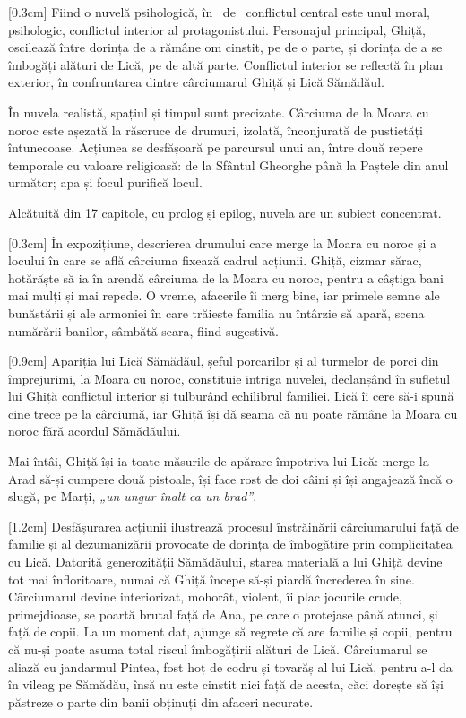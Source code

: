 [0.3cm]
Fiind o nuvelă psihologică, în \operatitle\ de \operaauthor\ conflictul central este unul moral, psihologic, conflictul interior al protagonistului. Personajul principal, Ghiță, oscilează între dorința de a rămâne om cinstit, pe de o parte, și dorința de a se îmbogăți alături de Lică, pe de altă parte. Conflictul interior se reflectă în plan exterior, în confruntarea dintre cârciumarul Ghiță și Lică Sămădăul.

În nuvela realistă, spațiul și timpul sunt precizate. Cârciuma de la Moara cu noroc este așezată la răscruce de drumuri, izolată, înconjurată de pustietăți întunecoase. Acțiunea se desfășoară pe parcursul unui an, între două repere temporale cu valoare religioasă: de la Sfântul Gheorghe până la Paștele din anul următor; apa și focul purifică locul.

Alcătuită din 17 capitole, cu prolog și epilog, nuvela are un subiect concentrat.

[0.3cm]
În expozițiune, descrierea drumului care merge la Moara cu noroc și a locului în care se află cârciuma fixează cadrul acțiunii. Ghiță, cizmar sărac, hotărăște să ia în arendă cârciuma de la Moara cu noroc, pentru a câștiga bani mai mulți și mai repede. O vreme, afacerile îi merg bine, iar primele semne ale bunăstării și ale armoniei în care trăiește familia nu întârzie să apară, scena numărării banilor, sâmbătă seara, fiind sugestivă.

[0.9cm]
Apariția lui Lică Sămădăul, șeful porcarilor și al turmelor de porci din împrejurimi, la Moara cu noroc, constituie intriga nuvelei, declanșând în sufletul lui Ghiță conflictul interior și tulburând echilibrul familiei. Lică îi cere să-i spună cine trece pe la cârciumă, iar Ghiță își dă seama că nu poate rămâne la Moara cu noroc fără acordul Sămădăului.

Mai întâi, Ghiță își ia toate măsurile de apărare împotriva lui Lică: merge la Arad să-și cumpere două pistoale, își face rost de doi câini și își angajează încă o slugă, pe Marți, \textit{„un ungur înalt ca un brad”}.

[1.2cm]
Desfășurarea acțiunii ilustrează procesul înstrăinării cârciumarului față de familie și al dezumanizării provocate de dorința de îmbogățire prin complicitatea cu Lică. Datorită generozității Sămădăului, starea materială a lui Ghiță devine tot mai înfloritoare, numai că Ghiță începe să-și piardă încrederea în sine. Cârciumarul devine interiorizat, mohorât, violent, îi plac jocurile crude, primejdioase, se poartă brutal față de Ana, pe care o protejase până atunci, și față de copii. La un moment dat, ajunge să regrete că are familie și copii, pentru că nu-și poate asuma total riscul îmbogățirii alături de Lică. Cârciumarul se aliază cu jandarmul Pintea, fost hoț de codru și tovarăș al lui Lică, pentru a-l da în vileag pe Sămădău, însă nu este cinstit nici față de acesta, căci dorește să își păstreze o parte din banii obținuți din afaceri necurate.

